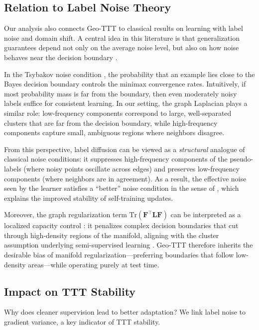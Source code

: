 \documentclass{article}
\theoremstyle{plain}
\theoremstyle{definition}
\theoremstyle{remark}
\newcommand{\Lap}{\mathbf{L}}      %
\newcommand{\F}{\mathbf{F}}        %
\begin{document}
\subsection{Relation to Label Noise Theory}
\label{sec:labelnoise}

Our analysis also connects Geo-TTT to classical results on learning with label noise and domain shift. A central idea in this literature is that generalization guarantees depend not only on the average noise level, but also on how noise behaves near the decision boundary \cite{tsybakov2009, ben2010theoryshift}.

In the Tsybakov noise condition \cite{tsybakov2009}, the probability that an example lies close to the Bayes decision boundary controls the minimax convergence rates. Intuitively, if most probability mass is far from the boundary, then even moderately noisy labels suffice for consistent learning. In our setting, the graph Laplacian plays a similar role: low-frequency components correspond to large, well-separated clusters that are far from the decision boundary, while high-frequency components capture small, ambiguous regions where neighbors disagree.

From this perspective, label diffusion can be viewed as a \emph{structural} analogue of classical noise conditions:
it suppresses high-frequency components of the pseudo-labels (where noisy points oscillate across edges) and preserves low-frequency components (where neighbors are in agreement). As a result, the effective noise seen by the learner satisfies a “better” noise condition in the sense of \cite{tsybakov2009}, which explains the improved stability of self-training updates.

Moreover, the graph regularization term $\mathrm{Tr}(\F^\top \Lap \F)$ can be interpreted as a localized capacity control \cite{koltchinskii2006localization, grandvalet2005entropy}: it penalizes complex decision boundaries that cut through high-density regions of the manifold, aligning with the cluster assumption underlying semi-supervised learning \cite{chapelle2006ssl, belkin2006manifold}. Geo-TTT therefore inherits the desirable bias of manifold regularization—preferring boundaries that follow low-density areas—while operating purely at test time.


\subsection{Impact on TTT Stability}
Why does cleaner supervision lead to better adaptation? We link label noise to gradient variance, a key indicator of TTT stability.
\end{document}
